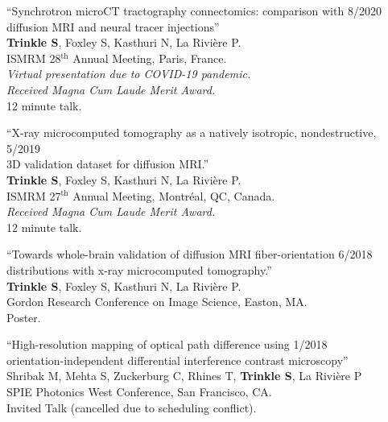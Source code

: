\documentclass[10pt,letterpaper]{article}
\begin{document}
\begin{benumerate}{6}

\item{``Synchrotron microCT tractography connectomics: comparison with \hfill 8/2020\\ diffusion MRI and neural tracer injections''\\
    \textbf{Trinkle S}, Foxley S, Kasthuri N, La Rivière P.\\
    ISMRM 28$^{\text{th}}$ Annual Meeting, Paris, France.\\
    \textit{Virtual presentation due to COVID-19 pandemic.}\\
    \textit{Received Magna Cum Laude Merit Award.}\\
    12 minute talk.}

\item{``X-ray microcomputed tomography as a natively isotropic, nondestructive, \hfill 5/2019\\
    3D validation dataset for diffusion MRI.''\\
    \textbf{Trinkle S}, Foxley S, Kasthuri N, La Rivière P.\\
    ISMRM 27$^{\text{th}}$ Annual Meeting, Montr\'eal, QC, Canada.\\
    \textit{Received Magna Cum Laude Merit Award.}\\
    12 minute talk.}
  
\item{``Towards whole-brain validation of diffusion MRI fiber-orientation \hfill 6/2018\\
    distributions with x-ray microcomputed tomography.''\\
    \textbf{Trinkle S}, Foxley S, Kasthuri N, La Rivière P.\\
    Gordon Research Conference on Image Science, Easton, MA. \\
    Poster.}

\item{``High-resolution mapping of optical path difference using \hfill 1/2018\\
    orientation-independent differential interference contrast microscopy'' \\
    Shribak M, Mehta S, Zuckerburg C, Rhines T, \textbf{Trinkle S}, La Rivi\`ere P\\
    SPIE Photonics West Conference, San Francisco, CA. \\
    Invited Talk (cancelled due to scheduling conflict).}
  

\end{benumerate}
\end{document}
